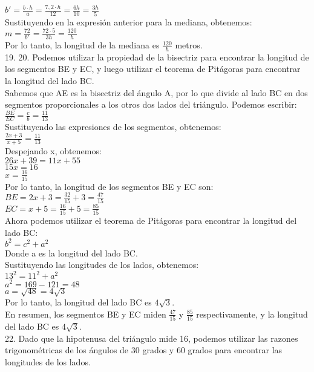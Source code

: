 \documentclass{article}
\begin{document}
$b' = \frac{b \cdot h}{a} = \frac{7,2 \cdot h}{12} = \frac{6h}{10} = \frac{3h}{5}$\\
Sustituyendo en la expresión anterior para la mediana, obtenemos:\\
$m = \frac{72}{b'} = \frac{72 \cdot 5}{3h} = \frac{120}{h}$\\
Por lo tanto, la longitud de la mediana es $\frac{120}{h}$ metros.\\
{\Large 19.}
{\Large 20.}
Podemos utilizar la propiedad de la bisectriz para encontrar la longitud de los segmentos BE y EC, y luego utilizar el teorema de Pitágoras para encontrar la longitud del lado BC.\\
Sabemos que AE es la bisectriz del ángulo A, por lo que divide al lado BC en dos segmentos proporcionales a los otros dos lados del triángulo. Podemos escribir:\\
$\frac{BE}{EC} = \frac{c}{b} = \frac{11}{13}$\\
Sustituyendo las expresiones de los segmentos, obtenemos:\\
$\frac{2x+3}{x+5} = \frac{11}{13}$\\
Despejando x, obtenemos:\\
$26x + 39 = 11x + 55$\\
$15x = 16$\\
$x = \frac{16}{15}$\\
Por lo tanto, la longitud de los segmentos BE y EC son:\\
$BE = 2x+3 = \frac{32}{15} + 3 = \frac{47}{15}$\\
$EC = x+5 = \frac{16}{15} + 5 = \frac{85}{15}$\\
Ahora podemos utilizar el teorema de Pitágoras para encontrar la longitud del lado BC:\\
$b^2 = c^2 + a^2$\\
Donde a es la longitud del lado BC.\\
Sustituyendo las longitudes de los lados, obtenemos:\\
$13^2 = 11^2 + a^2$\\
$a^2 = 169 - 121 = 48$\\
$a = \sqrt{48} = 4\sqrt{3}$\\
Por lo tanto, la longitud del lado BC es $4\sqrt{3}$.\\
En resumen, los segmentos BE y EC miden $\frac{47}{15}$ y $\frac{85}{15}$ respectivamente, y la longitud del lado BC es $4\sqrt{3}$.\\
{\Large 22.}
Dado que la hipotenusa del triángulo mide 16, podemos utilizar las razones trigonométricas de los ángulos de 30 grados y 60 grados para encontrar las longitudes de los lados.\\
\end{document}
